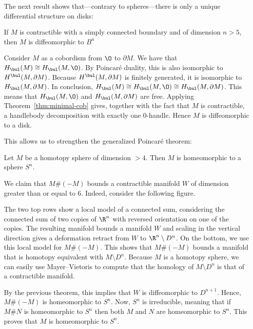 The next result shows that---contrary to spheres---there is only a unique differential structure on disks:
\begin{theorem}
    If $M$ is contractible with a simply connected boundary and of dimension $n >  5$, then $M$ is diffeomorphic to $B^{n}$
\end{theorem}
\begin{myproof}
    Consider $M$ as a cobordism from  $\O$ to  $\partial M$.
    We have that  $H_\bul(M) \cong H_\bul(M, \O)$.
    By Poincaré duality, this is also isomorphic to  $H^\bul(M, \partial M)$.
    Because  $H^{\bul}(M, \partial M)$ is finitely generated, it is isomorphic to $H_\bul(M, \partial M)$.
    In conclusion, $H_\bul(M) \cong H_\bul(M, \O) \cong H_\bul(M, \partial M)$.
    This means that $H_\bul(M, \O)$ and  $H_\bul(M, \partial M)$ are free.
    Applying Theorem~\ref{thm:minimal-cob} gives, together with the fact that $M$ is contractible, a handlebody decomposition with exactly one $0$-handle.
    Hence $M$ is diffeomorphic to a disk.
\end{myproof}

\filbreak
This allows us to strengthen the generalized Poincaré theorem:
\begin{theorem}
    Let $M$ be a homotopy sphere of dimension  $> 4$. Then $M$ is homeomorphic to a sphere $S^{n}$.
\end{theorem}
\begin{myproof}
    We claim that $M \# (-M)$ bounds a contractible manifold $W$ of dimension greater than or equal to $6$.
    Indeed, consider the following figure.
\begin{figure}[H]
    \centering
    \label{fig:connected-sum-homotopy-spheres}
\end{figure}
The two top rows show a local model of a connected sum, considering the connected sum of two copies of $\R^{n}$ with reversed orientation on one of the copies.
The resulting manifold bounds a manifold $W$ and scaling in the vertical direction gives a deformation retract from $W$ to  $ \R^{n} \setminus D^{n}$.
On the bottom, we use this local model for $ M \# (-M)$. This shows that $M \#(-M)$ bounds a manifold that is homotopy equivalent with  $M \setminus D^{n}$.
Because $M$ is a homotopy sphere, we can easily use Mayer--Vietoris to compute that the homology of $M \setminus D^{n}$ is that of a contractible manifold.

By the previous theorem, this implies that $W$ is diffeomorphic to $D^{n+1}$.
Hence, $M \#(-M)$ is homeomorphic to $S^{n}$.
Now, $S^{n}$ is irreducible, meaning that if $M \# N$ is homeomorphic to  $S^{n}$ then both $M$ and $N$ are homeomorphic to $S^{n}$.
This proves that $M$ is homeomorphic to  $S^{n}$.
\end{myproof}

